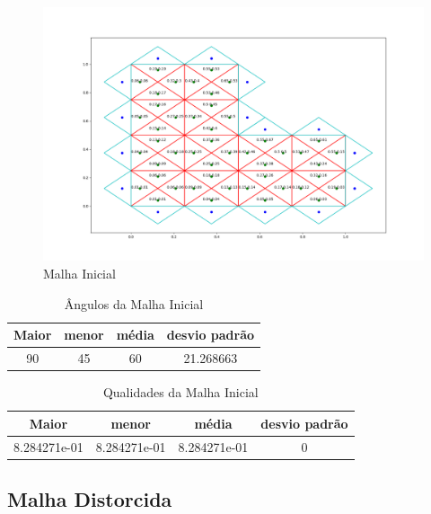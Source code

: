 \begin{figure}[ht]
    \centering
    \includegraphics[width=1\linewidth]{fig/malha_inicial.png}
    \caption{Malha Inicial}
    \label{fig:malha-inicial}
\end{figure}

\begin{table}[hb]
 \centering
 \par\caption{Ângulos da Malha Inicial}
\begin{tabular}{c|c|c|c}
 Maior&menor&média&desvio padrão\\\hline\hline
  90&45&60&21.268663\\\hline
 \end{tabular}
 \label{tab:angulos-malha-inicial}
\end{table}

\begin{table}[hb]
 \centering
 \par\caption{Qualidades da Malha Inicial}
\begin{tabular}{c|c|c|c}
 Maior&menor&média&desvio padrão\\\hline\hline
 8.284271e-01&8.284271e-01&8.284271e-01&0\\\hline
 \end{tabular}
 \label{tab:qualidades-malha-inicial}
\end{table}

\newpage
\subsection{Malha Distorcida}

